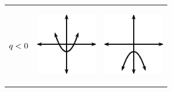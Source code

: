 \begin{center}
\begin{xtabular*}{\mytablewidth}[t]{|p{10\mystarwidth}|p{10\mystarwidth}|p{10\mystarwidth}|}
    
        
                  \begin{math}q<{}0\end{math}
                 &
    
    
        
                  
    \setcounter{subfigure}{0}

\label{m39345*id242017}
    \begin{center}
    \label{m39345*id242017!!!underscore!!!media}\label{m39345*id242017!!!underscore!!!printimage}\includegraphics[width=100px]{col11306.imgs/m39345_MG10C11_017.png} %
        
      \vspace{2pt}
    \vspace{.1in}
    
    \end{center}



    \addtocounter{footnote}{-0}
    
                 &
    
    
        
                  
    \setcounter{subfigure}{0}

\label{m39345*id242029}
    \begin{center}
    \label{m39345*id242029!!!underscore!!!media}\label{m39345*id242029!!!underscore!!!printimage}\includegraphics[width=100px]{col11306.imgs/m39345_MG10C11_018.png} %
        

\end{center}
\end{xtabular*}
\end{center}
